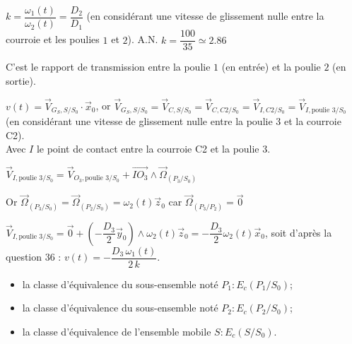 \ifprof
\begin{corrige}
$ k = \dfrac{\omega_1(t)}{\omega_2(t)} = \dfrac{D_2}{D_1}$ (en considérant une vitesse de glissement nulle entre la courroie et les poulies $1$ et $2$).
A.N. $ k = \dfrac{100}{35} \simeq 2.86$

C'est le rapport de transmission entre la poulie $1$ (en entrée) et la poulie $2$ (en sortie).
\end{corrige}
\else
\fi

\ifprof
\begin{corrige}
$v(t) = \overrightarrow{V}_{G_S, S/S_0} \cdot \vec x_0$, or $\overrightarrow{V}_{G_S, S/S_0} = \overrightarrow{V}_{C, S/S_0} = \overrightarrow{V}_{C, C2/S_0} = \overrightarrow{V}_{I, C2/S_0} = \overrightarrow{V}_{I, \text{poulie } 3/S_0}$ (en considérant une vitesse de glissement nulle entre la poulie $3$ et la courroie C2).\\

Avec $I$ le point de contact entre la courroie C2 et la poulie $3$.

$\overrightarrow{V}_{I, \text{poulie } 3 /S_0} = \overrightarrow{V}_{O_3, \text{poulie } 3/S_0} + \overrightarrow{IO_3} \wedge \overrightarrow{\Omega}_{(P_3/S_0)}$

Or $\overrightarrow{\Omega}_{(P_3/S_0)} = \overrightarrow{\Omega}_{(P_2/S_0)} = \omega_2(t) \vec z_0$ \qquad car $\overrightarrow{\Omega}_{(P_3/P_2)} = \overrightarrow 0$

$\overrightarrow{V}_{I, \text{poulie } 3 /S_0} = \overrightarrow 0 + (-\dfrac{D_3}{2} \vec y_0) \wedge \omega_2(t) \vec z_0 = -\dfrac{D_3}{2} \omega_2(t) \vec x_0$, soit d'après la question 36 :
$ v(t) = - \dfrac{D_3 \, \omega_1(t)}{2 \, k}$.
\end{corrige}
\else
\fi




\begin{itemize}
  \item la classe d'équivalence du sous-ensemble noté $P_{1}: E_{c}\left(P_{1} / S_{0}\right)$;
  \item la classe d'équivalence du sous-ensemble noté $P_{2}: E_{c}\left(P_{2} / S_{0}\right)$;
  \item la classe d'équivalence de l'ensemble mobile $S: E_{c}\left(S / S_{0}\right)$.
\end{itemize}

